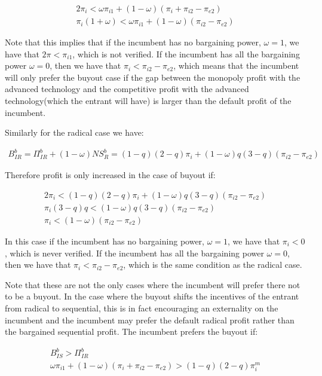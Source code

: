 \documentclass[11pt]{article}
\begin{document}
\begin{align*}
2 \pi_i <\omega \pi_{i1}+(1-\omega)(\pi_i+\pi_{i2}-\pi_{e2}) \\
 \pi_i(1+\omega) <\omega \pi_{i1}+(1-\omega)(\pi_{i2}-\pi_{e2}) 
\end{align*}

Note that this implies that if the incumbent has no bargaining power, $\omega=1$, we have that $2\pi<\pi_{i1}$, which is not verified. If the incumbent has all the bargaining power $\omega=0$, then we have that  $\pi_i <\pi_{i2}-\pi_{e2}$, which means that the incumbent will only prefer the buyout case if the gap between the monopoly profit with the advanced technology and the competitive profit with the advanced technology(which the entrant will have) is larger than the default profit of the incumbent. 

Similarly for the radical case we have: 

\begin{align*}
B_{IR}^{b}=\Pi_{IR}^{b}+(1-\omega)NS_R^{b}=(1-q)(2-q)\pi_i+(1-\omega)q(3-q)(\pi_{i2}-\pi_{e2})
\end{align*}

Therefore profit is only increased in the case of buyout if:

\begin{align*}
2 \pi_i<(1-q)(2-q)\pi_i+(1-\omega)q(3-q)(\pi_{i2}-\pi_{e2}) \\
\pi_i(3-q)q<(1-\omega)q(3-q)(\pi_{i2}-\pi_{e2}) \\
\pi_i<(1-\omega)(\pi_{i2}-\pi_{e2})
\end{align*}

In this case if the incumbent has no bargaining power, $\omega=1$, we have that $\pi_i<0$, which is never verified. If the incumbent has all the bargaining power $\omega=0$, then we have that  $\pi_i<\pi_{i2}-\pi_{e2}$, which is the same condition as the radical case. 

Note that these are not the only cases where the incumbent will prefer there not to be a buyout. In the case where the buyout shifts the incentives of the entrant from radical to sequential, this is in fact encouraging an externality on the incumbent and the incumbent may prefer the default radical profit rather than the bargained sequential profit. The incumbent prefers the buyout if:

\begin{align*}
B_{IS}^{b}>\Pi_{IR}^{b}
\\
\omega \pi_{i1}+(1-\omega)(\pi_i+\pi_{i2}-\pi_{e2}) >(1-q)(2-q)\pi_i^m \\
\end{align*}
\end{document}
